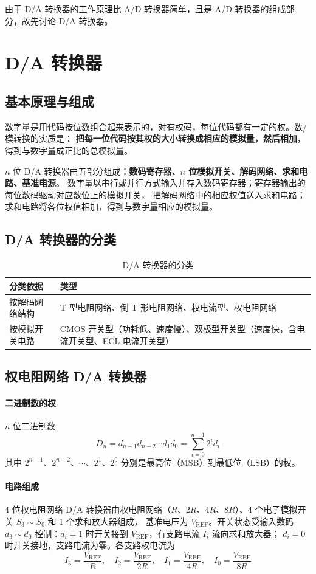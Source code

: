 由于 D/A 转换器的工作原理比 A/D 转换器简单，且是 A/D 转换器的组成部分，故先讨论 D/A 转换器。

\section{D/A 转换器}
\subsection{基本原理与组成}
数字量是用代码按位数组合起来表示的，对有权码，每位代码都有一定的权。数/模转换的实质是：
\textbf{把每一位代码按其权的大小转换成相应的模拟量，然后相加}，得到与数字量成正比的总模拟量。

$n$ 位 D/A 转换器由五部分组成：\textbf{数码寄存器、$n$ 位模拟开关、解码网络、求和电路、基准电源}。
数字量以串行或并行方式输入并存入数码寄存器；寄存器输出的每位数码驱动对应数位上的模拟开关，
把解码网络中的相应权值送入求和电路；求和电路将各位权值相加，得到与数字量相应的模拟量。

\subsection{D/A 转换器的分类}
\begin{table}[htbp]
\centering
\caption{D/A 转换器的分类}
\begin{tabular}{p{}p{}}
\toprule
分类依据 & 类型 \\
\midrule
按解码网络结构 & T 型电阻网络、倒 T 形电阻网络、权电流型、权电阻网络 \\
按模拟开关电路 & CMOS 开关型（功耗低、速度慢）、双极型开关型（速度快，含电流开关型、ECL 电流开关型） \\
\bottomrule
\end{tabular}
\end{table}

\subsection{权电阻网络 D/A 转换器}
\paragraph{二进制数的权}
$n$ 位二进制数
\[
D_n=d_{n-1}d_{n-2}\cdots d_1d_0=\sum_{i=0}^{n-1}2^id_i
\]
其中 $2^{n-1}$、$2^{n-2}$、$\cdots$、$2^1$、$2^0$ 分别是最高位（MSB）到最低位（LSB）的权。

\paragraph{电路组成}
4 位权电阻网络 D/A 转换器由权电阻网络（$R$、$2R$、$4R$、$8R$）、4 个电子模拟开关 $S_3\sim S_0$ 和 1 个求和放大器组成，
基准电压为 $V_\text{REF}$。开关状态受输入数码 $d_3\sim d_0$ 控制：$d_i=1$ 时开关接到 $V_\text{REF}$，有支路电流 $I_i$ 流向求和放大器；
$d_i=0$ 时开关接地，支路电流为零。各支路权电流为
\[
I_3=\frac{V_\text{REF}}{R},\quad I_2=\frac{V_\text{REF}}{2R},\quad
I_1=\frac{V_\text{REF}}{4R},\quad I_0=\frac{V_\text{REF}}{8R}
\]

